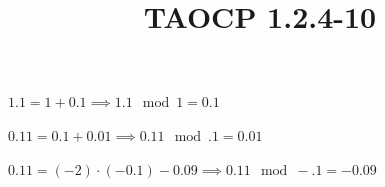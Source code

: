 \documentclass{article}
\title{TAOCP 1.2.4\mbox{-}10}
\begin{document}
\maketitle

\( 1.1 = 1 + 0.1 \implies 1.1 \mod 1 = 0.1 \)

\( 0.11 = 0.1 + 0.01 \implies 0.11 \mod .1 = 0.01 \)

\( 0.11 = (-2)\cdot (-0.1) - 0.09 \implies 0.11 \mod -.1 = -0.09 \)
\end{document}
